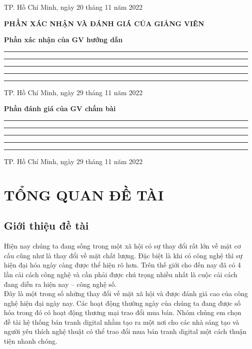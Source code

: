 \documentclass{article}
\begin{document}
\begin{flushright}
TP. Hồ Chí Minh, ngày 20 tháng 11 năm  2022    \\
	
\end{flushright}
\hspace{13cm}{ Tác giả}
\newpage
\begin{center}
		\textbf	{\Large
	PHẦN XÁC NHẬN VÀ ĐÁNH GIÁ CỦA GIẢNG VIÊN }
\end{center}
\begin{flushleft}
\textbf	{\large
Phần xác nhận của GV hướng dẫn\\ }
\rule{16cm}{0.01cm}
\rule{16cm}{0.01cm}
\rule{16cm}{0.01cm}
\rule{16cm}{0.01cm}
\rule{16cm}{0.01cm}

\end{flushleft}
\begin{flushright}
TP. Hồ Chí Minh, ngày 29 tháng 11 năm  2022\\
	
\end{flushright}
\hspace{11.5cm}{ (Kí và ghi họ tên)}
\vspace{4cm}

\begin{flushleft}
	\textbf	{\large
		Phần đánh giá của GV chấm bài\\ }
	\rule{16cm}{0.01cm}
	\rule{16cm}{0.01cm}
	\rule{16cm}{0.01cm}
	\rule{16cm}{0.01cm}
	\rule{16cm}{0.01cm}
	
\end{flushleft}
\begin{flushright}
	TP. Hồ Chí Minh, ngày 29 tháng 11 năm  2022\\
	
\end{flushright}
\hspace{11.5cm}{(Kí và ghi họ tên)}
\newpage

\tableofcontents
\newpage
\section{TỔNG QUAN ĐỀ TÀI}
\label{sec: Tổng quan đề tài} 
\subsection{Giới thiệu đề tài}
{\large
Hiện nay chúng ta đang sống trong một xã hội có sự thay đổi rất lớn về mặt cơ cấu cũng như là thay đổi về mặt chất lượng. Đặc biệt là khi có công nghệ thì sự hiện đại hóa ngày càng được thể hiện rõ hơn. Trên thế giới cho đến nay đã có 4 lần cải cách công nghệ và cần phải được chú trọng nhiều nhất là cuộc cải cách đang diễn ra hiện nay – công nghệ số.\\
\indent Đây là một trong số những thay đổi về mặt xã hội và được đánh giá cao của công nghệ hiện đại ngày nay. Các hoạt động thường ngày của chúng ta đang được số hóa trong đó có hoạt động thương mại trao đổi mua bán. Nhóm chúng em chọn đề tài hệ thống bán tranh digital nhằm tạo ra một nơi cho các nhà sáng tạo và người yêu thích nghệ thuật có thể trao đổi mua bán tranh digital một cách thuận tiện nhanh chóng.\\
}
\end{document}
